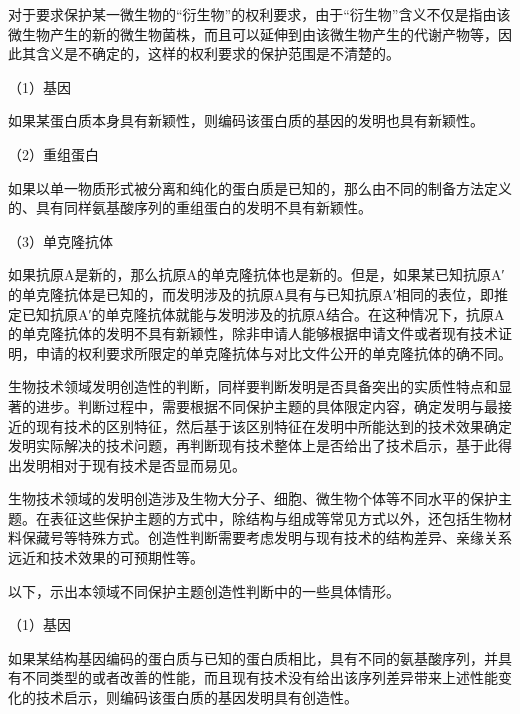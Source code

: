 对于要求保护某一微生物的“衍生物”的权利要求，由于“衍生物”含义不仅是指由该微生物产生的新的微生物菌株，而且可以延伸到由该微生物产生的代谢产物等，因此其含义是不确定的，这样的权利要求的保护范围是不清楚的。

{\setlength{\parindent}{17.1bp}（1）基因\par}

如果某蛋白质本身具有新颖性，则编码该蛋白质的基因的发明也具有新颖性。

{\setlength{\parindent}{17.1bp}（2）重组蛋白\par}

如果以单一物质形式被分离和纯化的蛋白质是已知的，那么由不同的制备方法定义的、具有同样氨基酸序列的重组蛋白的发明不具有新颖性。

{\setlength{\parindent}{17.1bp}（3）单克隆抗体\par}

如果抗原A是新的，那么抗原A的单克隆抗体也是新的。但是，如果某已知抗原A′的单克隆抗体是已知的，而发明涉及的抗原A具有与已知抗原A′相同的表位，即推定已知抗原A′的单克隆抗体就能与发明涉及的抗原A结合。在这种情况下，抗原A的单克隆抗体的发明不具有新颖性，除非申请人能够根据申请文件或者现有技术证明，申请的权利要求所限定的单克隆抗体与对比文件公开的单克隆抗体的确不同。

生物技术领域发明创造性的判断，同样要判断发明是否具备突出的实质性特点和显著的进步。判断过程中，需要根据不同保护主题的具体限定内容，确定发明与最接近的现有技术的区别特征，然后基于该区别特征在发明中所能达到的技术效果确定发明实际解决的技术问题，再判断现有技术整体上是否给出了技术启示，基于此得出发明相对于现有技术是否显而易见。

生物技术领域的发明创造涉及生物大分子、细胞、微生物个体等不同水平的保护主题。在表征这些保护主题的方式中，除结构与组成等常见方式以外，还包括生物材料保藏号等特殊方式。创造性判断需要考虑发明与现有技术的结构差异、亲缘关系远近和技术效果的可预期性等。

以下，示出本领域不同保护主题创造性判断中的一些具体情形。

{\setlength{\parindent}{17.1bp}（1）基因\par}

如果某结构基因编码的蛋白质与已知的蛋白质相比，具有不同的氨基酸序列，并具有不同类型的或者改善的性能，而且现有技术没有给出该序列差异带来上述性能变化的技术启示，则编码该蛋白质的基因发明具有创造性。

